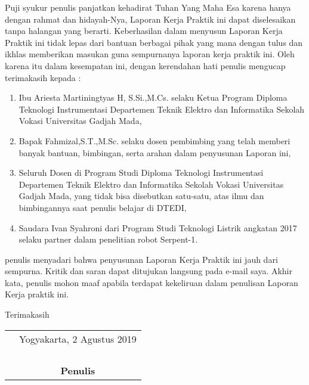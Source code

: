 \documentclass{DTEDI_KP}
\begin{document}
	
	\cover
	
	\approvalpage
	
	\preface
	
	Puji syukur penulis panjatkan kehadirat Tuhan Yang Maha Esa karena hanya dengan rahmat dan hidayah-Nya, Laporan Kerja Praktik ini dapat diselesaikan tanpa halangan yang berarti. Keberhasilan dalam menyusun Laporan Kerja Praktik ini tidak lepas dari bantuan berbagai pihak yang mana dengan tulus dan ikhlas memberikan masukan guna sempurnanya laporan kerja praktik ini. Oleh karena itu dalam kesempatan ini, dengan kerendahan hati penulis mengucap terimakasih kepada :
	
	\begin{enumerate}
		\item Ibu Ariesta Martiningtyas H, S.Si.,M.Cs. selaku Ketua Program Diploma Teknologi Instrumentasi Departemen Teknik Elektro dan Informatika Sekolah Vokasi Universitas Gadjah Mada,
		\item  Bapak Fahmizal,S.T.,M.Sc. selaku dosen pembimbing yang telah memberi banyak bantuan, bimbingan, serta arahan dalam penyusunan Laporan ini,
		\item Seluruh Dosen di Program Studi Diploma Teknologi Instrumentasi Departemen Teknik Elektro dan Informatika Sekolah Vokasi Universitas Gadjah Mada, yang tidak bisa disebutkan satu-satu, atas ilmu dan bimbingannya saat penulis belajar di DTEDI,
		\item Saudara Ivan Syahroni dari Program Studi Teknologi Listrik angkatan 2017 selaku partner dalam penelitian robot Serpent-1.
	\end{enumerate}

penulis menyadari bahwa penyusunan Laporan Kerja Praktik ini jauh dari sempurna. Kritik dan saran dapat ditujukan langsung pada e-mail saya. Akhir kata, penulis mohon maaf apabila terdapat kekeliruan dalam penulisan Laporan Kerja praktik ini.

\vspace{0.1cm}

Terimakasih

	\begin{tabular}{p{7.5cm}c}
	&Yogyakarta, 2 Agustus 2019\\
	&\\
	&\\
	&\\
	&\\
	&\textbf{Penulis}
	\end{tabular}

\tableofcontents
{}
\listoftables
{}
\listoffigures
{}
\end{document}
